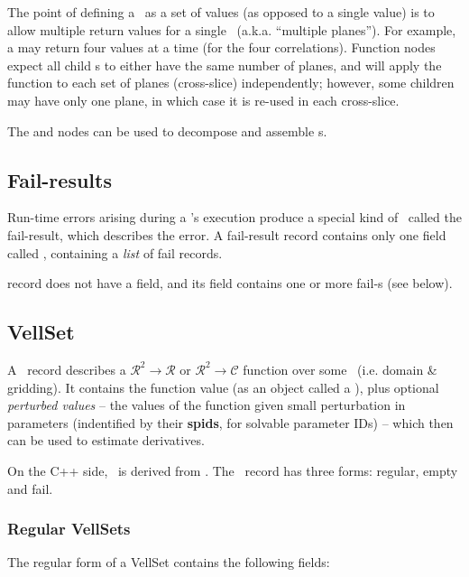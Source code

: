 \documentclass[10pt,twoside]{book}
\begin{document}
  The point of defining a \Result\ as a set of \VellSet{} values (as opposed to
  a single value) is to allow multiple return values for a single \Cells\
  (a.k.a. ``multiple planes''). For example, a  may return four
  values at a time (for the four correlations). Function nodes expect all child
  \Result{}s to either have the same number of planes, and will apply the
  function to each set of planes (cross-slice) independently; however, some
  children may have only one plane, in which case it is re-used in each
  cross-slice.

  The  and  nodes can be used to decompose and
  assemble \Result{}s.

\subsection{Fail-results}

  Run-time errors arising during a \Request{}'s execution produce a special
  kind of \Result\ called the fail-result, which describes the error. A
  fail-result record contains only one field called \qq{fail}, containing
  a {\em list} of fail records.
  
  record does not have a  field, and its 
  field contains one or more fail-\VellSet{}s (see below). 

\subsection{VellSet}

  A \VellSet\ record describes a $\mathcal{R}^2\rightarrow\mathcal{R}$ or
  $\mathcal{R}^2\rightarrow\mathcal{C}$ function over some \Cells\ (i.e. domain
  \& gridding). It contains the function value (as an object called a \Vells),
  plus optional {\em perturbed values} -- the values of the function given
  small perturbation in parameters (indentified by their {\bf spids}, for
  solvable parameter IDs) -- which then can be used to estimate derivatives.

  On the C++ side, \VellSet\ is derived from . The \VellSet\
  record has three forms: regular, empty and fail.
  
  \subsubsection{Regular VellSets}
  
  The regular form of a VellSet contains the following fields:
\end{document}
